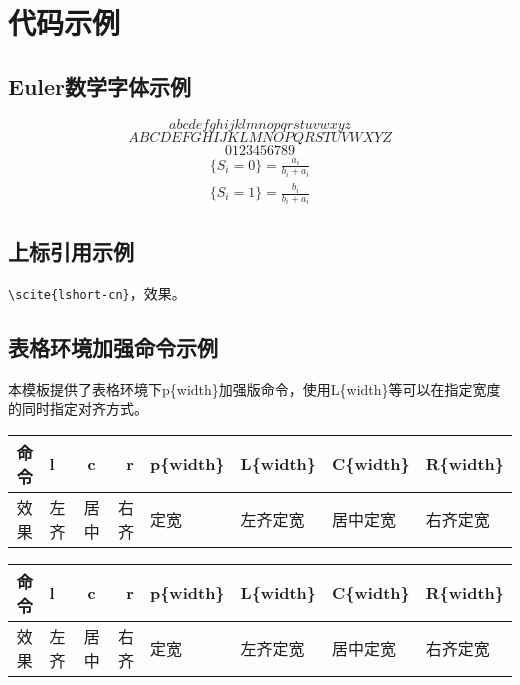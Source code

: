 \chapter{代码示例}
\label{chap:example}
\section{Euler数学字体示例}
$$
abcdefghijklmnopqrstuvwxyz
$$
$$
ABCDEFGHIJKLMNOPQRSTUVWXYZ
$$
$$
0123456789
$$
\begin{equation}
\begin{split}
\{S_i=0\}=\frac{a_i}{b_i+a_i} \\
\{S_i=1\}=\frac{b_i}{b_i+a_i} \label{1}
\end{split}
\end{equation}

\section{上标引用示例}
\verb|\scite{lshort-cn}|，效果。

\section{表格环境加强命令示例}
本模板提供了表格环境下p\{width\}加强版命令，使用L\{width\}等可以在指定宽度的同时指定对齐方式。

\begin{minipage}{\textwidth}
\begin{Codex}[numbers=left]
\begin{table}
\label{tab:tblcmp}
\centering
\begin{tabular}{c||l|c|r|p{2.5cm}|L{2.5cm}|C{2.5cm}|R{2.5cm}}
\hline
命令&l&c&r&p\{width\}&L\{width\}&C\{width\}&R\{width\}\\
\hline
效果&左齐&居中&右齐&定宽&左齐定宽&居中定宽&右齐定宽\\
\hline
\end{tabular}
\end{table}
\end{Codex}

\label{tab:tblcmp}
\centering
\begin{tabular}{c||l|c|r|p{2.5cm}|L{2.5cm}|C{2.5cm}|R{2.5cm}}
\hline
命令&l&c&r&p\{width\}&L\{width\}&C\{width\}&R\{width\}\\
\hline
效果&左齐&居中&右齐&定宽&左齐定宽&居中定宽&右齐定宽\\
\hline
\end{tabular}
\end{minipage}

